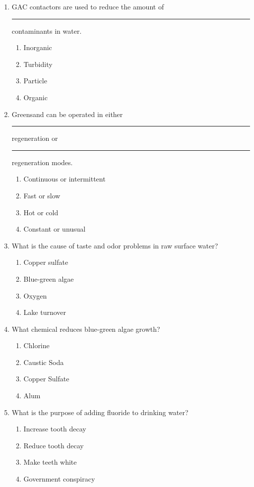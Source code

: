 \documentclass[10pt]{article}
\begin{document}
\begin{enumerate}
\begin{enumerate}
\item GAC contactors are used to reduce the amount of \rule{1cm}{0.5pt}  contaminants in water.
\begin{enumerate}
\item Inorganic
\item Turbidity
\item Particle
\item Organic
\end{enumerate}

\item Greensand can be operated in either \rule{1cm}{0.5pt}  regeneration or \rule{1cm}{0.5pt} regeneration modes.
\begin{enumerate}
\item Continuous or intermittent
\item Fast or slow
\item Hot or cold
\item Constant or unusual
\end{enumerate}

\item  What is the cause of taste and odor problems in raw surface water?\\
\begin{enumerate}
\item Copper sulfate\\
\item Blue-green algae\\
\item Oxygen\\
\item Lake turnover
\end{enumerate}

\item  What chemical reduces blue-green algae growth?\\
\begin{enumerate}
\item Chlorine\\
\item Caustic Soda\\
\item Copper Sulfate\\
\item Alum
\end{enumerate}


\item What is the purpose of adding fluoride to drinking water?
\begin{enumerate}
\item Increase tooth decay
\item Reduce tooth decay
\item Make teeth white
\item Government conspiracy
\end{enumerate}


\end{enumerate}
\end{enumerate}
\end{document}
